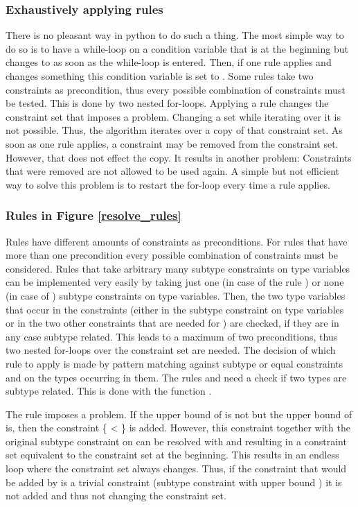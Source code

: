 \subsubsection{Exhaustively applying rules}
There is no pleasant way in python to do such a thing. The most simple way to do so is to have a while-loop on a condition variable  that is  at the beginning but changes to  as soon as the while-loop is entered. Then, if one rule applies and changes something this condition variable is set to .
Some rules take two constraints as precondition, thus every possible combination of constraints must be tested. This is done by two nested for-loops.
Applying a rule changes the constraint set that imposes a problem. Changing a set while iterating over it is not possible. Thus, the algorithm iterates over a copy of that constraint set. As soon as one rule applies, a constraint may be removed from the constraint set. However, that does not effect the copy. It results in another problem: Constraints that were removed are not allowed to be used again.
A simple but not efficient way to solve this problem is to restart the for-loop every time a rule applies.

\subsubsection{Rules in Figure \ref{resolve_rules}}
Rules have different amounts of constraints as preconditions. For rules that have more than one precondition every possible combination of constraints must be considered. Rules that take arbitrary many subtype constraints on type variables can be implemented very easily by taking just one (in case of the rule ) or none (in case of ) subtype constraints on type variables.
Then, the two type variables that occur in the constraints (either in the subtype constraint on type variables or in the two other constraints that are needed for ) are checked, if they are in any case subtype related.
This leads to a maximum of two preconditions, thus two nested for-loops over the constraint set are needed.
The decision of which rule to apply is made by pattern matching against subtype or equal constraints and on the types occurring in them.
The rules  and  need a check if two types are subtype related. This is done with the function .

The rule  imposes a problem. If the upper bound of  is not  but the upper bound of  is, then the constraint \{ < \} is added. However, this constraint together with the original subtype constraint on  can be resolved with  and  resulting in a constraint set equivalent to the constraint set at the beginning.
This results in an endless loop where the constraint set always changes. Thus, if the constraint that would be added by  is a trivial constraint (subtype constraint with upper bound ) it is not added and thus not changing the constraint set.

